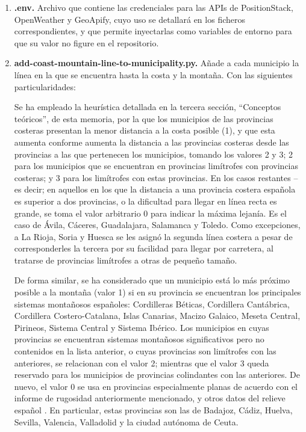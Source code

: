 \begin{enumerate}
    \item \textbf{.env.} Archivo que contiene las credenciales para las APIs de PositionStack, OpenWeather y GeoApify, cuyo uso se detallará en los ficheros correspondientes, y que permite inyectarlas como variables de entorno para que su valor no figure en el repositorio.
    
    \item \textbf{add-coast-mountain-line-to-municipality.py.} Añade a cada municipio la línea en la que se encuentra hasta la costa y la montaña. Con las siguientes particularidades:

    Se ha empleado la heurística detallada en la tercera sección, ``Conceptos teóricos'', de esta memoria, por la que los municipios de las provincias costeras presentan la menor distancia a la costa posible (1), y que esta aumenta conforme aumenta la distancia a las provincias costeras desde las provincias a las que pertenecen los municipios, tomando los valores 2 y 3; 2 para los municipios que se encuentran en provincias limítrofes con provincias costeras; y 3 para los limítrofes con estas provincias. En los casos restantes –es decir; en aquellos en los que la distancia a una provincia costera española es superior a dos provincias, o la dificultad para llegar en línea recta es grande, se toma el valor arbitrario 0 para indicar la máxima lejanía. Es el caso de Ávila, Cáceres, Guadalajara, Salamanca y Toledo. Como excepciones, a La Rioja, Soria y Huesca se les asignó la segunda línea costera a pesar de corresponderles la tercera por su facilidad para llegar por carretera, al tratarse de provincias limítrofes a otras de pequeño tamaño.

    De forma similar, se ha considerado que un municipio está lo más próximo posible a la montaña (valor 1) si en su provincia se encuentran los principales sistemas montañosos españoles: Cordilleras Béticas, Cordillera Cantábrica, Cordillera Costero-Catalana, Islas Canarias, Macizo Galaico, Meseta Central, Pirineos, Sistema Central y Sistema Ibérico. Los municipios en cuyas provincias se encuentran sistemas montañosos significativos pero no contenidos en la lista anterior, o cuyas provincias son limítrofes con las anteriores, se relacionan con el valor 2; mientras que el valor 3 queda reservado para los municipios de provincias colindantes con las anteriores. De nuevo, el valor 0 se usa en provincias especialmente planas de acuerdo con el informe de rugosidad anteriormente mencionado, y otros datos del relieve español \cite{relieve}. En particular, estas provincias son las de Badajoz, Cádiz, Huelva, Sevilla, Valencia, Valladolid y la ciudad autónoma de Ceuta.
    

\end{enumerate}
